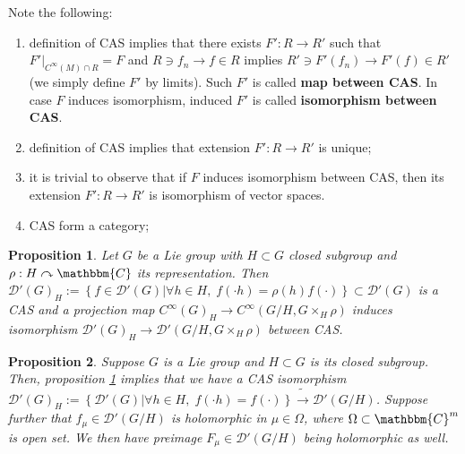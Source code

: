 \documentclass{article}
\newcommand{\assign}{:=}
\newcommand{\tmtextbf}[1]{{\bfseries{#1}}}
\newtheorem{proposition}{Proposition}
{\theorembodyfont{\rmfamily}\newtheorem{remark}{Remark}}
\begin{document}
\begin{remark}
  Note the following:
  \begin{enumerate}
    \item definition of CAS implies that there exists $F' : R \rightarrow R'$
    such that $F' \big|_{C^{\infty} (M) \cap R} = F$ and $R \ni f_n
    \rightarrow f \in R$ implies $R' \ni F' (f_n) \rightarrow F' (f) \in R'$
    (we simply define $F'$ by limits). Such $F'$ is called \tmtextbf{map
    between CAS}. In case $F$ induces isomorphism, induced $F'$ is called
    \tmtextbf{isomorphism between CAS}.
    
    \item definition of CAS implies that extension $F' : R \rightarrow R'$ is
    unique;
    
    \item it is trivial to observe that if $F$ induces isomorphism between
    CAS, then its extension $F' : R \rightarrow R'$ is isomorphism of vector
    spaces.
    
    \item CAS form a category;
  \end{enumerate}
\end{remark}

\begin{proposition}
  \label{CAS:prop-GoverP}Let $G$ be a Lie group with $H \subset G$ closed
  subgroup and $\rho : H \curvearrowright \mathbbm{C}$ its representation.
  Then $\mathcal{D}' (G)_H \assign \left\{ f \in \mathcal{D}' (G) \big|
  \forall h \in H, \; f (\cdot h) = \rho (h) f (\cdot) \right\} \subset
  \mathcal{D}' (G)$ is a CAS and a projection map $C^{\infty} (G)_H
  \rightarrow C^{\infty} (G / H, G \times_H \rho)$ induces isomorphism
  $\mathcal{D}' (G)_H \rightarrow \mathcal{D}' (G / H, G \times_H \rho)$
  between CAS.
\end{proposition}

\begin{proposition}
  \label{CAS:prop-GoverP-holo}Suppose $G$ is a Lie group and $H \subset G$ is
  its closed subgroup. Then, proposition \ref{CAS:prop-GoverP} implies that we
  have a CAS isomorphism $\mathcal{D}' (G)_H \assign \left\{ \mathcal{D}' (G)
  \big| \forall h \in H, \; f (\cdot h) = f (\cdot) \right\}
  \tilde{\rightarrow} \mathcal{D}' (G / H)$. Suppose further that $f_{\mu} \in
  \mathcal{D}' (G / H)$ is holomorphic in $\mu \in \Omega$, where $\Omega
  \subset \mathbbm{C}^m$ is open set. We then have preimage $F_{\mu} \in
  \mathcal{D}' (G / H)$ being holomorphic as well.
\end{proposition}
\end{document}
